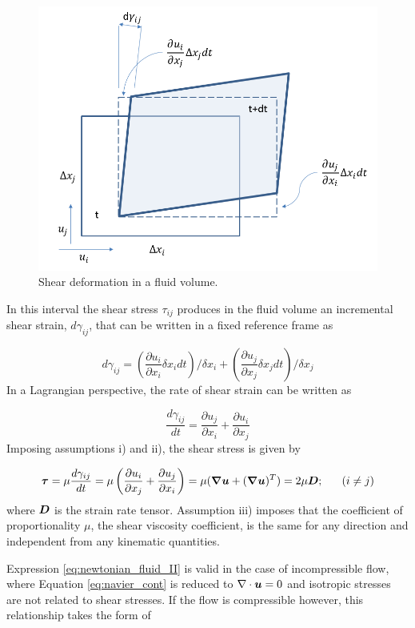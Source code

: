 %
\begin{figure}[ht!]
	\centering 
	\includegraphics[width=0.65\linewidth]{Figures/2.Chapter/shear_ij}
	\caption{Shear deformation in a fluid volume.}
	\label{fig:shear_xy}
\end{figure}
%

In this interval the shear stress $\tau_{ij}$ produces in the fluid volume an incremental shear strain, $d\gamma_{ij}$, that can be written in a fixed reference frame as 

%
	\begin{equation} \label{eq:shear_strain_I}
		d\gamma_{ij}={\left( \frac{\partial u_i}{\partial x_i} \delta x_i dt \right)}/{\delta x_i}+{\left( \frac{\partial u_j}{\partial x_j} \delta x_j dt \right)}/{\delta x_j}
	\end{equation}
%
In a Lagrangian perspective, the rate of shear strain can be written as

%
	\begin{equation} \label{eq:shear_strain_II}
		\frac{d\gamma_{ij}}{dt}=\frac{\partial u_j}{\partial x_i}+ \frac{\partial u_i}{\partial x_j}
	\end{equation}
%
Imposing assumptions i) and ii), the shear stress is given by

%
	\begin{equation} \label{eq:newtonian_fluid_II}
		\boldsymbol{\tau} = \mu \frac{d\gamma_{ij}}{dt}=\mu \left( \frac{\partial u_i}{\partial x_j}+ \frac{\partial u_j}{\partial x_i} \right)=\mu (\boldsymbol{\nabla}\boldsymbol{u}+ (\boldsymbol{\nabla}\boldsymbol{u})^T)=2\mu\boldsymbol{D} ; \;\;\;\;\;\; (i \neq j)
	\end{equation}
%
where $\boldsymbol{D}$ is the strain rate tensor. Assumption iii) imposes that the coefficient of proportionality $\mu$, the shear viscosity coefficient, is the same for any direction and independent from any kinematic quantities. 

Expression \eqref{eq:newtonian_fluid_II} is valid in the case of incompressible flow, where Equation \eqref{eq:navier_cont} is reduced to $\nabla\cdot\boldsymbol{u}=0$ and isotropic stresses are not related to shear stresses. If the flow is compressible however, this relationship takes the form of

